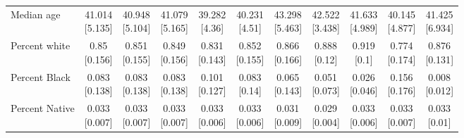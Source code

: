 \begin{tabular}[t]{lcccccccccc}
\addlinespace
Median age & \makecell[t]{41.014\\{[}5.135{]}} & \makecell[t]{40.948\\{[}5.104{]}} & \makecell[t]{41.079\\{[}5.165{]}} & \makecell[t]{39.282\\{[}4.36{]}} & \makecell[t]{40.231\\{[}4.51{]}} & \makecell[t]{43.298\\{[}5.463{]}} & \makecell[t]{42.522\\{[}3.438{]}} & \makecell[t]{41.633\\{[}4.989{]}} & \makecell[t]{40.145\\{[}4.877{]}} & \makecell[t]{41.425\\{[}6.934{]}}\\
\addlinespace
Percent white & \makecell[t]{0.85\\{[}0.156{]}} & \makecell[t]{0.851\\{[}0.155{]}} & \makecell[t]{0.849\\{[}0.156{]}} & \makecell[t]{0.831\\{[}0.143{]}} & \makecell[t]{0.852\\{[}0.155{]}} & \makecell[t]{0.866\\{[}0.166{]}} & \makecell[t]{0.888\\{[}0.12{]}} & \makecell[t]{0.919\\{[}0.1{]}} & \makecell[t]{0.774\\{[}0.174{]}} & \makecell[t]{0.876\\{[}0.131{]}}\\
\addlinespace
Percent Black & \makecell[t]{0.083\\{[}0.138{]}} & \makecell[t]{0.083\\{[}0.138{]}} & \makecell[t]{0.083\\{[}0.138{]}} & \makecell[t]{0.101\\{[}0.127{]}} & \makecell[t]{0.083\\{[}0.14{]}} & \makecell[t]{0.065\\{[}0.143{]}} & \makecell[t]{0.051\\{[}0.073{]}} & \makecell[t]{0.026\\{[}0.046{]}} & \makecell[t]{0.156\\{[}0.176{]}} & \makecell[t]{0.008\\{[}0.012{]}}\\
\addlinespace
Percent Native & \makecell[t]{0.033\\{[}0.007{]}} & \makecell[t]{0.033\\{[}0.007{]}} & \makecell[t]{0.033\\{[}0.007{]}} & \makecell[t]{0.033\\{[}0.006{]}} & \makecell[t]{0.033\\{[}0.006{]}} & \makecell[t]{0.031\\{[}0.009{]}} & \makecell[t]{0.029\\{[}0.004{]}} & \makecell[t]{0.033\\{[}0.006{]}} & \makecell[t]{0.033\\{[}0.007{]}} & \makecell[t]{0.033\\{[}0.01{]}}\\

\end{tabular}
